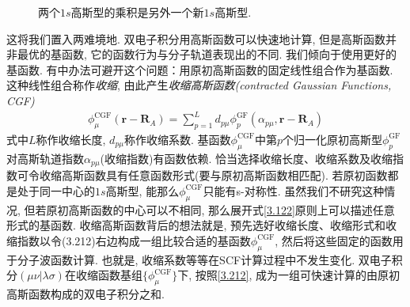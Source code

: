 \begin{figure}[h]\centering
	\def\FunctionA(x){
	3*sqrt(3)*exp(-9*x^2)*(2/3.1415)^(3/4)}
	\def\FunctionB(x){
	(4*2^(1/4))*(e^(-4*(-0.5+x)^2))/3.1415^(3/4)
	}
	\def\FunctionC(x){
	\FunctionB(x)*\FunctionA(x)/4.5
	}
	\caption{两个$1s$高斯型的乘积是另外一个新$1s$高斯型.}
	\label{f3.1}
\end{figure}
这将我们置入两难境地. 双电子积分用高斯函数可以快速地计算, 但是高斯函数并非最优的基函数, 它的函数行为与分子轨道表现出的不同. 我们倾向于使用更好的基函数. 有中办法可避开这个问题：用原初高斯函数的固定线性组合作为基函数. 这种线性组合称作\emph{收缩}, 由此产生\emph{收缩高斯函数(contracted Gaussian Functions, CGF)}
\begin{align}
\label{3.212}
\phi_\mu^{\mathrm{CGF}}(\mathbf{r-R}_A) = \sum_{p=1}^{L}d_{p\mu}\phi_p^\mathrm{GF}(\alpha_{p\mu},\mathbf{r-R}_{A})
\end{align} 
式中$L$称作收缩长度, $d_{p\mu}$称作收缩系数. 基函数$\phi_\mu^\mathrm{CGF}$中第$p$个归一化原初高斯型$\phi_p^\mathrm{GF}$对高斯轨道指数$\alpha_{p\mu}$(收缩指数)有函数依赖. 恰当选择收缩长度、收缩系数及收缩指数可令收缩高斯函数具有任意函数形式(要与原初高斯函数相匹配). 若原初函数都是处于同一中心的$1s$高斯型, 能那么$\phi_\mu^\mathrm{CGF}$只能有s-对称性. 虽然我们不研究这种情况, 但若原初高斯函数的中心可以不相同, 那么展开式\eqref{3.122}原则上可以描述任意形式的基函数. 收缩高斯函数背后的想法就是, 预先选好收缩长度、收缩形式和收缩指数以令(3.212)右边构成一组比较合适的基函数$\phi_\mu^\mathrm{CGF}$, 然后将这些固定的函数用于分子波函数计算. 也就是, 收缩系数等等在SCF计算过程中不发生变化. 双电子积分$(\mu\nu|\lambda\sigma)$在收缩函数基组$\{\phi_\mu^\mathrm{CGF}\}$下, 按照\eqref{3.212}, 成为一组可快速计算的由原初高斯函数构成的双电子积分之和. 
	
